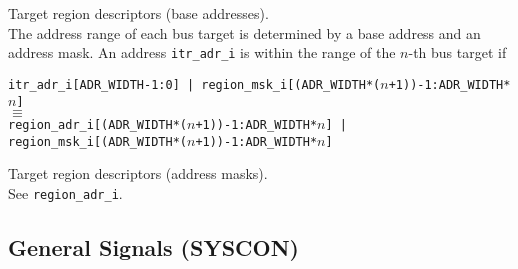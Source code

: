 \begin{description}[style=nextline]
  
\item[\texttt{region\_adr\_i}] Target region descriptors (base addresses). \\
  
  The address range of each bus target is determined by a base address and an address mask.
  An address \texttt{itr\_adr\_i} is within the range of the $n$-th bus target if 
  \begin{center}
    \texttt{itr\_adr\_i[ADR\_WIDTH-1:0] |
      region\_msk\_i[(ADR\_WIDTH*($n$+1))-1:ADR\_WIDTH*$n$]} \\
    $\equiv$ \\
    \texttt{region\_adr\_i[(ADR\_WIDTH*($n$+1))-1:ADR\_WIDTH*$n$] |
      region\_msk\_i[(ADR\_WIDTH*($n$+1))-1:ADR\_WIDTH*$n$]} \\
  \end{center}

\item[\texttt{region\_msk\_i}]  Target region descriptors (address masks). \\
  See \texttt{region\_adr\_i}. 
   
\end{description}

\subsection{General Signals (SYSCON)}

